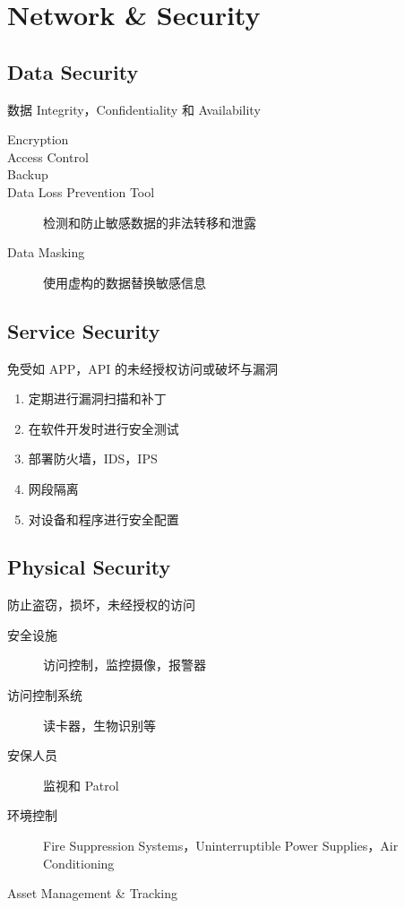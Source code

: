 \documentclass[11pt,journal,compsoc]{IEEEtran}
\begin{document}
\section{Network \& Security}


\subsection{Data Security}

数据 Integrity，Confidentiality 和 Availability

\begin{description}
    \item[Encryption]
    \item[Access Control]
    \item[Backup]
    \item[Data Loss Prevention Tool] 检测和防止敏感数据的非法转移和泄露
    \item[Data Masking] 使用虚构的数据替换敏感信息
\end{description}


\subsection{Service Security}

免受如 APP，API 的未经授权访问或破坏与漏洞

\begin{enumerate}
    \item 定期进行漏洞扫描和补丁

    \item 在软件开发时进行安全测试

    \item 部署防火墙，IDS，IPS

    \item 网段隔离

    \item 对设备和程序进行安全配置
\end{enumerate}


\subsection{Physical Security}

防止盗窃，损坏，未经授权的访问

\begin{description}
    \item[安全设施] 访问控制，监控摄像，报警器

    \item[访问控制系统] 读卡器，生物识别等

    \item[安保人员] 监视和 Patrol

    \item[环境控制] Fire Suppression Systems，Uninterruptible Power Supplies，Air Conditioning

    \item[Asset Management \& Tracking]
\end{description}
\end{document}
